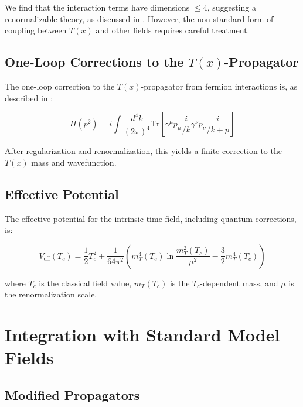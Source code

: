 \documentclass[12pt,a4paper]{article}
\newcommand{\Tfield}{T(x)}
\begin{document}
	We find that the interaction terms have dimensions $\leq 4$, suggesting a renormalizable theory, as discussed in \cite{WeinbergAsymSafety}. However, the non-standard form of coupling between $\Tfield$ and other fields requires careful treatment.
	
	\subsection{One-Loop Corrections to the $\Tfield$-Propagator}
	\label{sec:schleifenkorrekturen}
	
	The one-loop correction to the $\Tfield$-propagator from fermion interactions is, as described in \cite{pascher_feldtheorie_2025_en}:
	
	\begin{equation}
		\Pi(p^2) = i\int \frac{d^4k}{(2\pi)^4} \mathrm{Tr}\left[\gamma^{\mu}p_{\mu}\frac{i}{\slash{k}}\gamma^{\nu}p_{\nu}\frac{i}{\slash{k+p}}\right]
	\end{equation}
	
	After regularization and renormalization, this yields a finite correction to the $\Tfield$ mass and wavefunction.
	
	\subsection{Effective Potential}
	\label{sec:effektives_potential}
	
	The effective potential for the intrinsic time field, including quantum corrections, is:
	
	\begin{equation}
		V_{\text{eff}}(T_c) = \frac{1}{2}T_c^2 + \frac{1}{64\pi^2}\left(m_T^4(T_c)\ln\frac{m_T^2(T_c)}{\mu^2} - \frac{3}{2}m_T^4(T_c)\right)
	\end{equation}
	
	where $T_c$ is the classical field value, $m_T(T_c)$ is the $T_c$-dependent mass, and $\mu$ is the renormalization scale.
	
	\section{Integration with Standard Model Fields}
	\label{sec:integration_standardmodell}
	
	\subsection{Modified Propagators}
	\label{sec:modifizierte_propagatoren}
	
\end{document}

